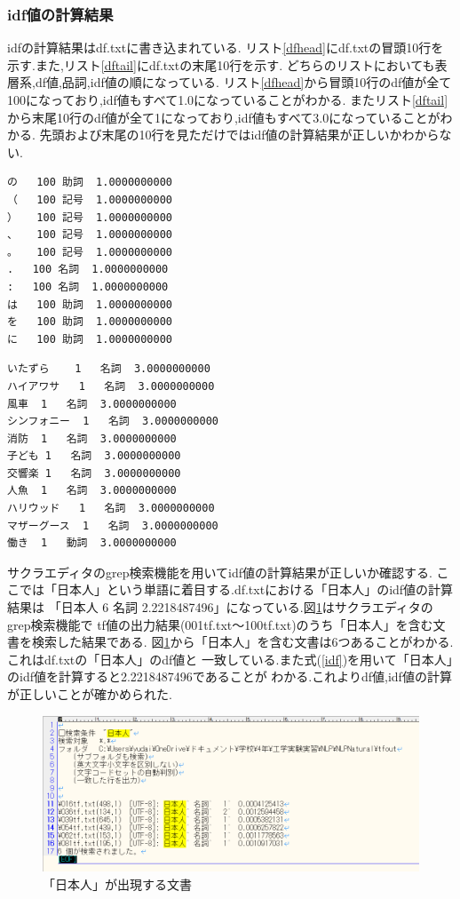 \documentclass[a4j]{jarticle}
\begin{document}
\subsubsection{idf値の計算結果}
idfの計算結果はdf.txtに書き込まれている.
リスト\ref{dfhead}にdf.txtの冒頭10行を示す.また,リスト\ref{dftail}にdf.txtの末尾10行を示す.
どちらのリストにおいても表層系,df値,品詞,idf値の順になっている.
リスト\ref{dfhead}から冒頭10行のdf値が全て100になっており,idf値もすべて1.0になっていることがわかる.
またリスト\ref{dftail}から末尾10行のdf値が全て1になっており,idf値もすべて3.0になっていることがわかる.
先頭および末尾の10行を見ただけではidf値の計算結果が正しいかわからない.
\begin{lstlisting}[basicstyle=\ttfamily\footnotesize, frame=single,label=dfhead,caption=df.txtの冒頭10行]
の	100	助詞	1.0000000000
（	100	記号	1.0000000000
）	100	記号	1.0000000000
、	100	記号	1.0000000000
。	100	記号	1.0000000000
.	100	名詞	1.0000000000
:	100	名詞	1.0000000000
は	100	助詞	1.0000000000
を	100	助詞	1.0000000000
に	100	助詞	1.0000000000
\end{lstlisting}

\begin{lstlisting}[basicstyle=\ttfamily\footnotesize, frame=single,label=dftail,caption=df.txtの末尾10行]
いたずら	1	名詞	3.0000000000
ハイアワサ	1	名詞	3.0000000000
風車	1	名詞	3.0000000000
シンフォニー	1	名詞	3.0000000000
消防	1	名詞	3.0000000000
子ども	1	名詞	3.0000000000
交響楽	1	名詞	3.0000000000
人魚	1	名詞	3.0000000000
ハリウッド	1	名詞	3.0000000000
マザーグース	1	名詞	3.0000000000
働き	1	動詞	3.0000000000
\end{lstlisting}

サクラエディタのgrep検索機能を用いてidf値の計算結果が正しいか確認する.
ここでは「日本人」という単語に着目する.df.txtにおける「日本人」のidf値の計算結果は
「日本人	6	名詞	2.2218487496」になっている.図\ref{japanese}はサクラエディタのgrep検索機能で
tf値の出力結果(001tf.txt～100tf.txt)のうち「日本人」を含む文書を検索した結果である.
図\ref{japanese}から「日本人」を含む文書は6つあることがわかる.これはdf.txtの「日本人」のdf値と
一致している.また式(\ref{idf})を用いて「日本人」のidf値を計算すると2.2218487496であることが
わかる.これよりdf値,idf値の計算が正しいことが確かめられた.
\begin{figure}[H]
	\centering
	\includegraphics[scale=0.75]{japanese.png}
	\caption{「日本人」が出現する文書}
   \label{japanese}
  \end{figure}
\end{document}
